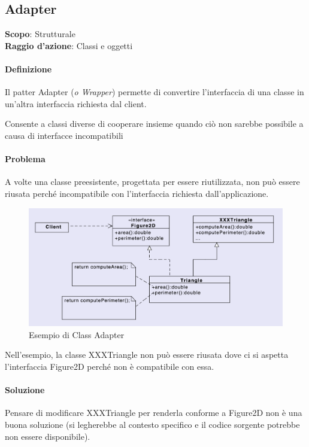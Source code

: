 \subsection{Adapter}


\textbf{Scopo}: Strutturale \\
\textbf{Raggio d'azione}: Classi e oggetti

\paragraph{Definizione}
Il patter Adapter (\textit{o Wrapper}) permette di convertire l'interfaccia di una classe in un'altra interfaccia richiesta dal client.

Consente a classi diverse di cooperare insieme quando ciò non sarebbe possibile a causa di interfacce incompatibili

\paragraph{Problema} A volte una classe preesistente, progettata per essere riutilizzata, non può essere riusata perché incompatibile con l'interfaccia richiesta dall'applicazione.

\begin{figure}[H]
    \centering
    \includegraphics[width=1\linewidth]{assets/pattern/adapter/class-adapter.png}
    \caption{Esempio di Class Adapter}
\end{figure}

Nell’esempio, la classe XXXTriangle non può essere riusata dove ci si aspetta l’interfaccia Figure2D perché non è compatibile con essa.

\paragraph{Soluzione} Pensare di modificare XXXTriangle per renderla conforme a Figure2D non è una buona soluzione (si legherebbe al contesto specifico e il codice sorgente potrebbe non essere disponibile).

